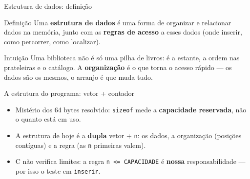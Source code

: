 \documentclass[aspectratio=169]{beamer}
\begin{document}
\begin{frame}{Estrutura de dados: definição}
  \begin{block}{Definição}
    Uma \textbf{estrutura de dados} é uma forma de organizar e relacionar
    dados na memória, junto com as \textbf{regras de acesso} a esses dados
    (onde inserir, como percorrer, como localizar).
  \end{block}
  \begin{exampleblock}{Intuição}
    Uma biblioteca não é só uma pilha de livros: é a estante, a ordem nas
    prateleiras e o catálogo. A \textbf{organização} é o que torna o acesso
    rápido --- os dados são os mesmos, o arranjo é que muda tudo.
  \end{exampleblock}
\end{frame}

\begin{frame}[shrink=8]{A estrutura do programa: vetor + contador}
  \begin{center}
  \end{center}
  \begin{itemize}
    \item Mistério dos 64 bytes resolvido: \texttt{sizeof} mede a
      \textbf{capacidade reservada}, não o quanto está em uso.
    \item A estrutura de hoje é a \textbf{dupla} vetor + \texttt{n}: os dados,
      a organização (posições contíguas) e a regra (as \texttt{n} primeiras
      valem).
    \item C não verifica limites: a regra \texttt{n <= CAPACIDADE} é
      \textbf{nossa} responsabilidade --- por isso o teste em \texttt{inserir}.
  \end{itemize}
\end{frame}
\end{document}
